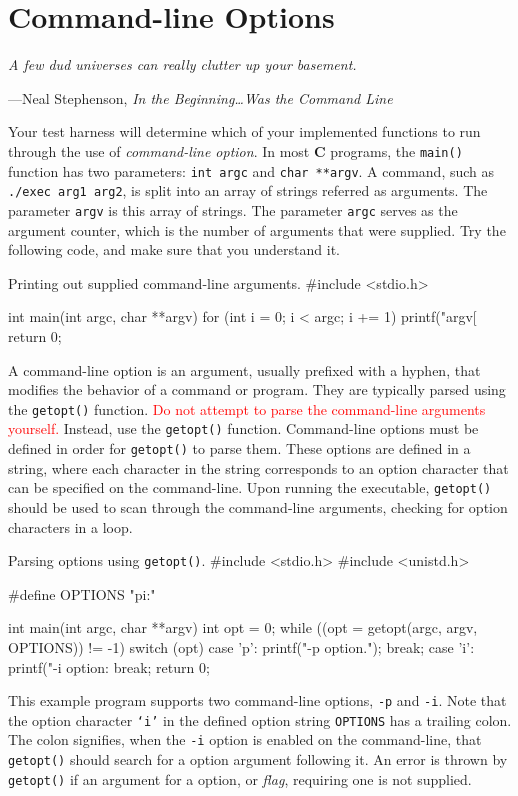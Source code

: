 \section{Command-line Options}
\textwidth
\epigraph{\emph{A few dud universes can really clutter up your basement.}}%
{---Neal Stephenson, \emph{In the Beginning\ldots Was the Command Line}}

\noindent
Your test harness will determine which of your implemented functions to
run through the use of \emph{command-line option}. In most \textbf{C}
programs, the \texttt{main()} function has two parameters: \texttt{int
argc} and \texttt{char **argv}. A command, such as \texttt{./exec arg1
arg2}, is split into an array of strings referred as arguments. The
parameter \texttt{argv} is this array of strings. The parameter
\texttt{argc} serves as the argument counter, which is the number of
arguments that were supplied. Try the following code, and make sure that
you understand it.

\begin{clisting}{Printing out supplied command-line arguments.}
#include <stdio.h>

int main(int argc, char **argv) {
    for (int i = 0; i < argc; i += 1) {
        printf("argv[%
    }
    return 0;
}
\end{clisting}

A command-line option is an argument, usually prefixed with a hyphen,
that modifies the behavior of a command or program. They are typically
parsed using the \texttt{getopt()} function. \textcolor{red}{Do not
attempt to parse the command-line arguments yourself.} Instead, use the
\texttt{getopt()} function. Command-line options must be defined in
order for \texttt{getopt()} to parse them. These options are defined in
a string, where each character in the string corresponds to an option
character that can be specified on the command-line. Upon running the
executable, \texttt{getopt()} should be used to scan through the
command-line arguments, checking for option characters in a loop.

\begin{clisting}{Parsing options using \texttt{getopt()}.}
#include <stdio.h>
#include <unistd.h>

#define OPTIONS "pi:"

int main(int argc, char **argv) {
    int opt = 0;
    while ((opt = getopt(argc, argv, OPTIONS)) != -1) {
        switch (opt) {
        case 'p':
            printf("-p option.\n");
            break;
        case 'i':
            printf("-i option: %
            break;
        }
    }
    return 0;
}
\end{clisting}

This example program supports two command-line options, \texttt{-p} and
\texttt{-i}. Note that the option character \texttt{`i'} in the defined
option string \texttt{OPTIONS} has a trailing colon. The colon
signifies, when the \texttt{-i} option is enabled on the command-line,
that \texttt{getopt()} should search for a option argument following it.
An error is thrown by \texttt{getopt()} if an argument for a option, or
\emph{flag}, requiring one is not supplied.

